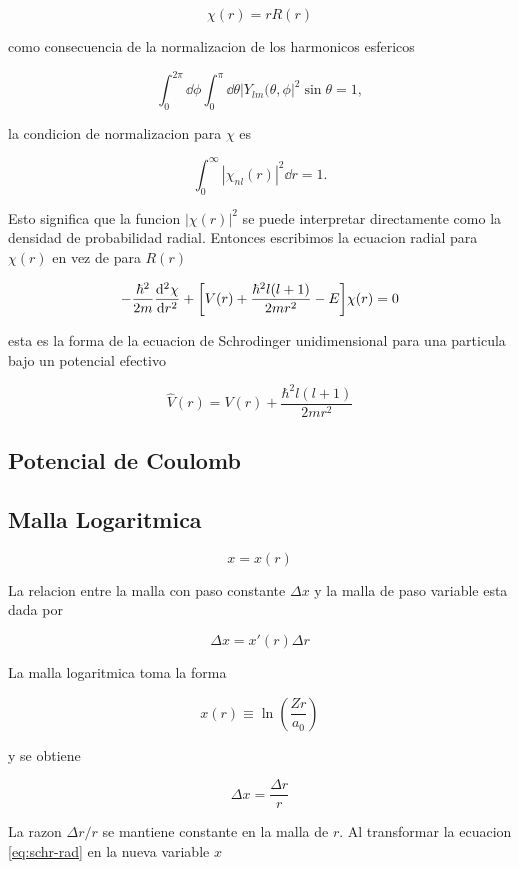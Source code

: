 \documentclass[11pt]{article}
\begin{document}
\[ \chi(r) = rR(r) \]

como consecuencia de la normalizacion de los harmonicos esfericos

\[ \int_0^{2\pi} \dd{\phi} \int_0^{\pi}\dd{\theta}|Y_{lm}(\theta,\phi|^2 \sin\theta = 1, \]

la condicion de normalizacion para \(\chi\) es

\[ \int_0^{\infty} | \chi_{nl}(r)|^2 \dd{r} = 1. \]

Esto significa que la funcion \(|\chi(r)|^2\) se puede interpretar directamente como la densidad de probabilidad radial. Entonces escribimos la ecuacion radial para \(\chi(r)\) en vez de para \(R(r)\)

\begin{equation}
\label{eq:schr-rad}
- \frac{\hbar^2}{2m}\dv[2]{\chi}{r} + \qty[V(r) + \frac{\hbar^2 l (l+1)}{2mr^2} - E] \chi(r) = 0
\end{equation}

esta es la forma de la ecuacion de Schrodinger unidimensional para una particula bajo un potencial efectivo

\[ \hat{V}(r) = V(r) + \frac{\hbar^2 l(l+1)}{2mr^2} \]
\subsection{Potencial de Coulomb}
\label{sec:org28a8187}


\subsection{Malla Logaritmica}
\label{sec:orgacaea8d}

\[ x = x(r) \]

La relacion entre la malla con paso constante \(\Delta x\) y la malla de paso variable esta dada por

\[ \Delta x  = x'(r) \Delta r \]

La malla logaritmica toma la forma

\[ x(r) \equiv \ln(\frac{Zr}{a_0}) \]

y se obtiene

\[ \Delta x = \frac{\Delta r}{r} \]

La razon \(\Delta r / r\) se mantiene constante en la malla de \(r\). Al transformar la ecuacion \ref{eq:schr-rad} en la nueva variable \(x\)
\end{document}
